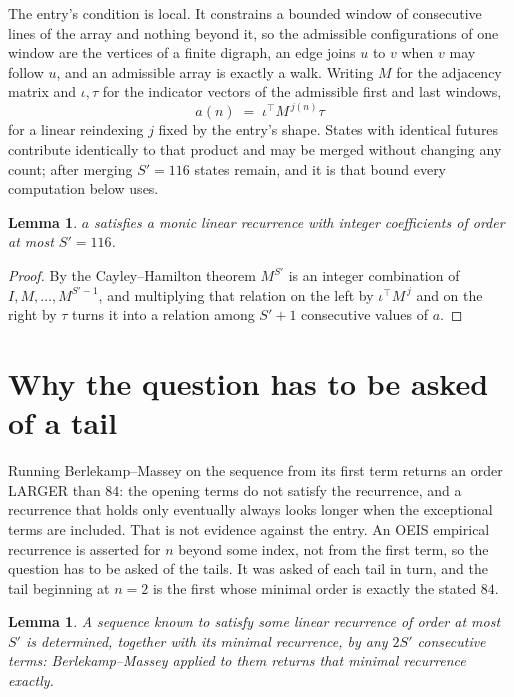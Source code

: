 \documentclass[11pt,a4paper]{article}
\theoremstyle{plain}
\newtheorem{lemma}[theorem]{Lemma}
\theoremstyle{definition}
\begin{document}
The entry's condition is local. It constrains a bounded window of consecutive lines of the
array and nothing beyond it, so the admissible configurations of one window are the vertices of
a finite digraph, an edge joins $u$ to $v$ when $v$ may follow $u$, and an admissible array is
exactly a walk. Writing $M$ for the adjacency matrix and $\iota,\tau$ for the indicator vectors
of the admissible first and last windows,
\[
a(n)\;=\;\iota^{\!\top}M^{\,j(n)}\tau
\]
for a linear reindexing $j$ fixed by the entry's shape. States with identical futures
contribute identically to that product and may be merged without changing any count; after
merging $S'=116$ states remain, and it is that bound every computation below uses.

\begin{lemma}\label{lem:cf}
$a$ satisfies a monic linear recurrence with integer coefficients of order at most $S'=116$.
\end{lemma}

\begin{proof}
By the Cayley--Hamilton theorem $M^{S'}$ is an integer combination of $I,M,\dots,M^{S'-1}$,
and multiplying that relation on the left by $\iota^{\!\top}M^{\,j}$ and on the right by
$\tau$ turns it into a relation among $S'+1$ consecutive values of $a$.
\end{proof}

\section{Why the question has to be asked of a tail}

Running Berlekamp--Massey on the sequence from its first term returns an order LARGER than $84$: the opening terms do not satisfy the recurrence, and a recurrence that holds only eventually always looks longer when the exceptional terms are included. That is not evidence against the entry. An OEIS empirical recurrence is asserted for $n$ beyond some index, not from the first term, so the question has to be asked of the tails. It was asked of each tail in turn, and the tail beginning at $n=2$ is the first whose minimal order is exactly the stated $84$.

\begin{lemma}\label{lem:bm}
A sequence known to satisfy some linear recurrence of order at most $S'$ is determined,
together with its minimal recurrence, by any $2S'$ consecutive terms: Berlekamp--Massey applied
to them returns that minimal recurrence exactly.
\end{lemma}
\end{document}
